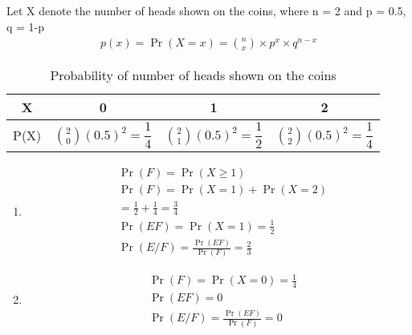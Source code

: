 Let X denote the number of heads shown on the coins, where n = 2 and p = 0.5, q = 1-p
\begin{align}
p(x) = \Pr(X=x) = \binom{n}{x}\times p^x\times q^{n-x}
\end{align}
\begin{table}[!ht]
\resizebox{\columnwidth}{!} {
\begin{tabular}{|c|c|c|c|}
\hline
     X&0&1&2  \\
     \hline
     P(X)&$\binom{2}{0}(0.5)^2=\dfrac{1}{4}$&$\binom{2}{1}(0.5)^2 = \dfrac{1}{2}$&$\binom{2}{2}(0.5)^2 = \dfrac{1}{4}$\\
     \hline
\end{tabular}
}
\caption{Probability of number of heads shown on the coins }
\label{1.17:table:1}
\end{table}
\begin{enumerate}
\item 
\begin{align}
&\Pr(F) = \Pr(X\geq 1)\\
&\Pr(F) = \Pr(X = 1) + \Pr(X = 2)\nonumber\\
       &= \frac{1}{2} + \frac{1}{4} = \frac{3}{4}\\
&\Pr(EF) = \Pr(X = 1) = \frac{1}{2}\\
&\Pr(E/F) =\frac{\Pr(EF)}{\Pr(F)} = \frac{2}{3}
\end{align}
\item
\begin{align}
&\Pr(F) = \Pr(X = 0) = \frac{1}{4}\\
&\Pr(EF) = 0\\
&\Pr(E/F) = \frac{\Pr(EF)}{\Pr(F)} = 0
\end{align} 
\end{enumerate}